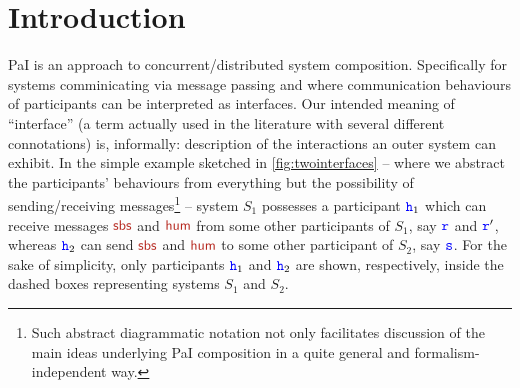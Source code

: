 
\section{Introduction}
\label{sec:Intro}

PaI is an approach to concurrent/distributed system composition. 
Specifically for systems comminicating via message passing and where
communication behaviours of participants can be interpreted as interfaces.  
Our intended meaning of ``interface'' (a term actually used in the literature with  several different connotations) is, informally: description of the interactions an outer system can
exhibit. 
In the simple example sketched in \cref{fig:twointerfaces}
--  where we abstract the participants' behaviours from everything but the possibility of 
 sending/receiving messages\footnote{Such abstract diagrammatic notation not only facilitates  
 discussion of the main ideas underlying PaI composition in a quite general  and formalism-independent way.}
   -- system $S_1$ possesses a participant 
 ${\mathtt{\color{blue}{ {h}}}}_1$ which can receive messages $\msg[sbs]$ and $\msg[hum]$ from some other participants of $S_1$, say ${\mathtt{\color{blue}{ {r}}}}$ and ${\mathtt{\color{blue}{ {r}}}}'$, whereas ${\mathtt{\color{blue}{ {h}}}}_2$ can send $\msg[sbs]$ and $\msg[hum]$ to some other participant of $S_2$, say ${\mathtt{\color{blue}{ {s}}}}$. 
For the sake of simplicity, only participants ${\mathtt{\color{blue}{ {h}}}}_1$ and ${\mathtt{\color{blue}{ {h}}}}_2$ are shown, respectively, inside the dashed boxes representing systems  $S_1$ and $S_2$.
 \begin{figure}[h]
\end{figure}


